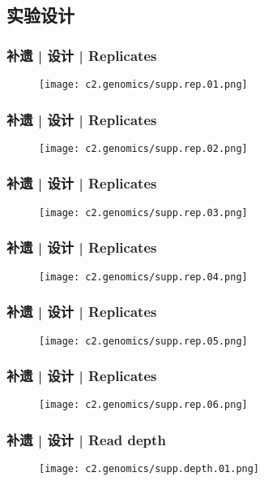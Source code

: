 \subsection{实验设计}
\begin{frame}
  \frametitle{补遗 | 设计 | Replicates}
  \begin{figure}
    \centering
    \texttt{[image: c2.genomics/supp.rep.01.png]}
  \end{figure}
\end{frame}

\begin{frame}
  \frametitle{补遗 | 设计 | Replicates}
  \begin{figure}
    \centering
    \texttt{[image: c2.genomics/supp.rep.02.png]}
  \end{figure}
\end{frame}

\begin{frame}
  \frametitle{补遗 | 设计 | Replicates}
  \begin{figure}
    \centering
    \texttt{[image: c2.genomics/supp.rep.03.png]}
  \end{figure}
\end{frame}

\begin{frame}
  \frametitle{补遗 | 设计 | Replicates}
  \begin{figure}
    \centering
    \texttt{[image: c2.genomics/supp.rep.04.png]}
  \end{figure}
\end{frame}

\begin{frame}
  \frametitle{补遗 | 设计 | Replicates}
  \begin{figure}
    \centering
    \texttt{[image: c2.genomics/supp.rep.05.png]}
  \end{figure}
\end{frame}

\begin{frame}
  \frametitle{补遗 | 设计 | Replicates}
  \begin{figure}
    \centering
    \texttt{[image: c2.genomics/supp.rep.06.png]}
  \end{figure}
\end{frame}

\begin{frame}
  \frametitle{补遗 | 设计 | Read depth}
  \begin{figure}
    \centering
    \texttt{[image: c2.genomics/supp.depth.01.png]}
  \end{figure}
\end{frame}

